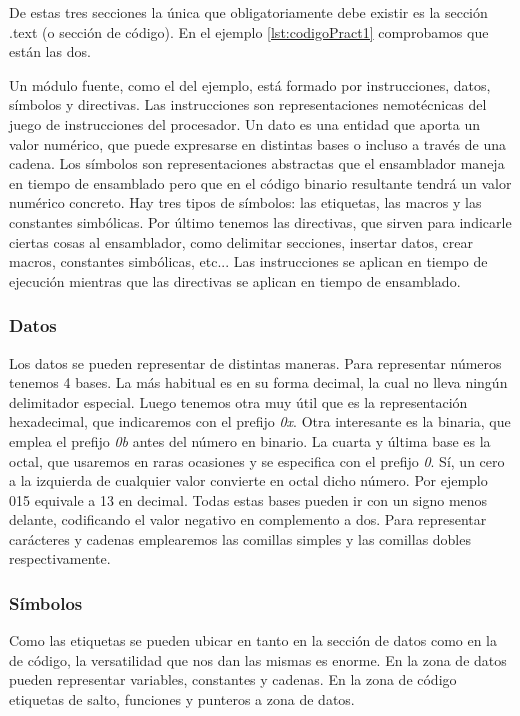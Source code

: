 De estas tres secciones la única que obligatoriamente debe existir es
la sección .text (o sección de código). En el ejemplo \ref{lst:codigoPract1}
comprobamos que están las dos.

Un módulo fuente, como el del ejemplo, está formado por instrucciones,
datos, símbolos y directivas. 
Las instrucciones son representaciones nemotécnicas del juego
de instrucciones del procesador. Un dato es una entidad que aporta un valor
numérico, que puede expresarse en distintas bases o incluso a través de una cadena.
Los símbolos son representaciones abstractas que el ensamblador maneja en tiempo
de ensamblado pero que en el código binario resultante tendrá un valor numérico
concreto. Hay tres tipos de símbolos: las etiquetas, las macros y las constantes simbólicas.
Por último tenemos las directivas, que sirven para indicarle ciertas cosas al
ensamblador, como delimitar secciones, insertar datos, crear macros, constantes
simbólicas, etc... Las instrucciones se aplican en tiempo de ejecución
mientras que las directivas se aplican en tiempo de ensamblado.

\subsubsection{Datos}

Los datos se pueden representar de distintas maneras. Para representar números tenemos
4 bases. La más habitual es en su forma decimal, la cual no lleva ningún delimitador
especial. Luego tenemos otra muy útil que es la representación hexadecimal, que
indicaremos con el prefijo {\it 0x}. Otra interesante es la binaria, que emplea el
prefijo {\it 0b} antes del número en binario. La cuarta y última base es la
octal, que usaremos en raras ocasiones y se especifica con el prefijo {\it 0}. Sí, un
cero a la izquierda de cualquier valor convierte en octal dicho número. Por ejemplo
015 equivale a 13 en decimal. Todas estas bases pueden ir con un signo menos delante,
codificando el valor negativo en complemento a dos. Para representar carácteres y cadenas
emplearemos las comillas simples y las comillas dobles respectivamente.

\subsubsection{Símbolos}

Como las etiquetas se pueden ubicar en tanto en la sección de datos como en la de código,
la versatilidad que nos dan las mismas es enorme. En la zona de datos pueden representar
variables, constantes y cadenas. En la zona de código etiquetas de salto, funciones y
punteros a zona de datos.

